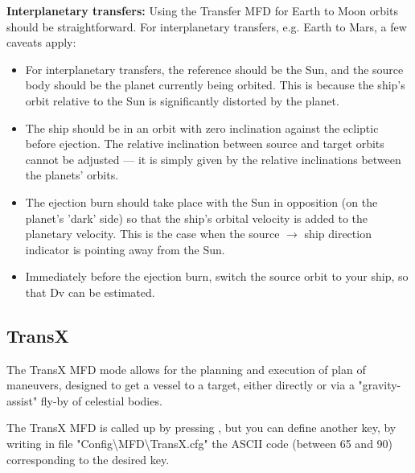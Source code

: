 \documentclass[Orbiter User Manual.tex]{subfiles}
\begin{document}
\textbf{Interplanetary transfers:}
Using the Transfer MFD for Earth to Moon orbits should be straightforward. For
interplanetary transfers, e.g. Earth to Mars, a few caveats apply:
\begin{itemize}
	\item For interplanetary transfers, the reference should be the Sun, and the
		source body should be the planet currently being orbited. This is
		because the ship's orbit relative to the Sun is significantly distorted
		by the planet.
	\item The ship should be in an orbit with zero inclination against the
		ecliptic before ejection. The relative inclination between source and
		target orbits cannot be adjusted --- it is simply given by the relative
		inclinations between the planets' orbits.
	\item The ejection burn should take place with the Sun in opposition (on the
		planet's 'dark' side) so that the ship's orbital velocity is added to
		the planetary velocity. This is the case when the source $\rightarrow$
		ship direction indicator is pointing away from the Sun.
	\item Immediately before the ejection burn, switch the source orbit to your
		ship, so that Dv can be estimated.
\end{itemize}


\subsection{TransX}
\label{ssec:mfd_transx}
The TransX MFD mode allows for the planning and execution of plan of maneuvers,
designed to get a vessel to a target, either directly or via a "gravity-assist"
fly-by of celestial bodies.

The TransX MFD is called up by pressing , but you can define another
key, by writing in file "Config\textbackslash MFD\textbackslash TransX.cfg" the
ASCII code (between 65 and 90) corresponding to the desired key.

\end{document}
